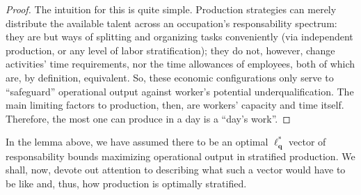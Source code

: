 \documentclass[hidelinks, nonatbib]{elsarticle}
\begin{document}
\begin{lemma}
\begin{proof}
        The intuition for this is quite simple. Production strategies can merely distribute the available talent across an occupation's responsability spectrum: they are but ways of splitting and organizing tasks conveniently (via independent production, or any level of labor stratification); they do not, however, change activities' time requirements, nor the time allowances of employees, both of which are, by definition, equivalent. So, these economic configurations only serve to ``safeguard'' operational output against worker's potential underqualification. The main limiting factors to production, then, are workers' capacity and time itself. Therefore, the most one can produce in a day is a ``day's work''.
    \end{proof}
\end{lemma}

In the lemma above, we have assumed there to be an optimal $\boldsymbol{\ell_{q}^{*}}$ vector of responsability bounds maximizing operational output in stratified production. We shall, now, devote out attention to describing what such a vector would have to be like and, thus, how production is optimally stratified.
\end{document}
